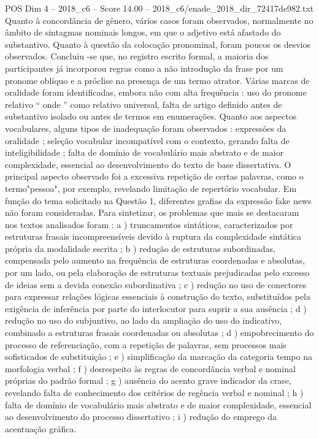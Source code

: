 \begin{textsample}{POS Dim 4 – 2018\_c6 – Score 14.00 – 2018\_c6/enade\_2018\_dir\_72417de982.txt}
Quanto à concordância de gênero, vários casos foram observados, normalmente no âmbito de sintagmas nominais longos, em que o adjetivo está afastado do substantivo.
Quanto à questão da colocação pronominal, foram poucos os desvios observados.
Concluiu -se que, no registro escrito formal, a maioria dos participantes já incorporou regras como a não introdução da frase por um pronome oblíquo e a próclise na presença de um termo atrator.
Várias marcas de oralidade foram identificadas, embora não com alta frequência : uso do pronome relativo “ onde ” como relativo universal, falta de artigo definido antes de substantivo isolado ou antes de termos em enumerações.
Quanto aos aspectos vocabulares, alguns tipos de inadequação foram observados : expressões da oralidade ; seleção vocabular incompatível com o contexto, gerando falta de inteligibilidade ; falta de domínio de vocabulário mais abstrato e de maior complexidade, essencial ao desenvolvimento do texto de base dissertativa.
O principal aspecto observado foi a excessiva repetição de certas palavras, como o termo"pessoa", por exemplo, revelando limitação de repertório vocabular.
Em função do tema solicitado na Questão 1, diferentes grafias da expressão fake news não foram consideradas.
Para sintetizar, os problemas que mais se destacaram nos textos analisados foram : a ) truncamentos sintáticos, caracterizados por estruturas frasais incompreensíveis devido à ruptura da complexidade sintática própria da modalidade escrita ; b ) redução de estruturas subordinadas, compensada pelo aumento na frequência de estruturas coordenadas e absolutas, por um lado, ou pela elaboração de estruturas textuais prejudicadas pelo excesso de ideias sem a devida conexão subordinativa ; c ) redução no uso de conectores para expressar relações lógicas essenciais à construção do texto, substituídos pela exigência de inferência por parte do interlocutor para suprir a sua ausência ; d ) redução no uso do subjuntivo, ao lado da ampliação do uso do indicativo, combinado a estruturas frasais coordenadas ou absolutas ; d ) empobrecimento do processo de referenciação, com a repetição de palavras, sem processos mais sofisticados de substituição ; e ) simplificação da marcação da categoria tempo na morfologia verbal ; f ) desrespeito às regras de concordância verbal e nominal próprias do padrão formal ; g ) ausência do acento grave indicador da crase, revelando falta de conhecimento dos critérios de regência verbal e nominal ; h ) falta de domínio de vocabulário mais abstrato e de maior complexidade, essencial ao desenvolvimento do processo dissertativo ; i ) redução do emprego da acentuação gráfica.

\end{textsample}
